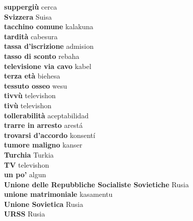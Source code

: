 \textbf{ suppergiù  } cerca \\
\textbf{ Svizzera  } Suisa \\
\textbf{ tacchino comune  } kalakuna \\
\textbf{ tardità  } cabesura \\
\textbf{ tassa d’iscrizione  } admision \\
\textbf{ tasso di sconto  } rebaha \\
\textbf{ televisione via cavo  } kabel \\
\textbf{ terza età  } biehesa \\
\textbf{ tessuto osseo  } wesu \\
\textbf{ tivvù  } televishon \\
\textbf{ tivù  } televishon \\
\textbf{ tollerabilità  } aceptabilidad \\
\textbf{ trarre in arresto  } arestá \\
\textbf{ trovarsi d’accordo  } konsentí \\
\textbf{ tumore maligno  } kanser \\
\textbf{ Turchia  } Turkia \\
\textbf{ TV  } televishon \\
\textbf{ un po’  } algun \\
\textbf{ Unione delle Repubbliche Socialiste Sovietiche  } Rusia \\
\textbf{ unione matrimoniale  } kasamentu \\
\textbf{ Unione Sovietica  } Rusia \\
\textbf{ URSS  } Rusia \\
